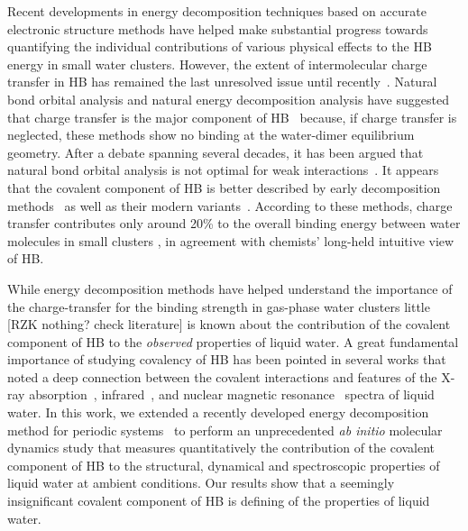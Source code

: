 \documentclass[aps,prl,reprint,amsmath,amssymb]{revtex4-1}
\begin{document}
Recent developments in energy decomposition techniques based on accurate electronic structure methods have helped make substantial progress towards quantifying the individual contributions of various physical effects to the HB energy in small water clusters. 
However, the extent of intermolecular charge transfer in HB has remained the last unresolved issue until recently~\cite{isaacs1999covalency,ghanty2000hydrogen,stone2017natural}. 
Natural bond orbital analysis\cite{weinhold1998natural} and natural energy decomposition analysis \cite{glendening1994natural} have suggested that charge transfer is the major component of HB~\cite{schenter1996natural,glendening2005natural,weinhold2005resonance} because, if charge transfer is neglected, these methods show no binding at the water-dimer equilibrium geometry. 
After a debate spanning several decades, it has been argued that natural bond orbital analysis is not optimal for weak interactions~\cite{stone2017natural}. 
It appears that the covalent component of HB is better described by early decomposition methods~\cite{kitaura1976new,bagus1984new,bagus1992decomposition,stevens1987frozen,chen1996energy,RZK0-SAPT} as well as their modern variants~\cite{mo2000energy,misquitta2003dispersion,khaliullin2007unravelling}. 
According to these methods, charge transfer contributes only around 20\% to the overall binding energy between water molecules in small clusters \cite{stevens1987frozen,chen1996energy,piquemal2005csov,khaliullin2009electron,cobar2012examination}, in agreement with chemists' long-held intuitive view of HB.

While energy decomposition methods have helped understand the importance of the charge-transfer for the binding strength in gas-phase water clusters little [RZK nothing? check literature] is known about the contribution of the covalent component of HB to the \emph{observed} properties of liquid water. 
A great fundamental importance of studying covalency of HB has been pointed in several works that  noted a deep connection between the covalent interactions and features of the X-ray absorption~\cite{NatureComm2013}, infrared~\cite{JPCL2013}, and nuclear magnetic resonance~\cite{NatureComm2015} spectra of liquid water. 
In this work, we extended a recently developed energy decomposition method for periodic systems~\cite{Khaliullin2013JCTC} to perform an unprecedented \emph{ab initio} molecular dynamics study that measures quantitatively the contribution of the covalent component of HB to the structural, dynamical and spectroscopic properties of liquid water at ambient conditions. 
Our results show that a seemingly insignificant covalent component of HB is defining of the properties of liquid water. 
\end{document}
